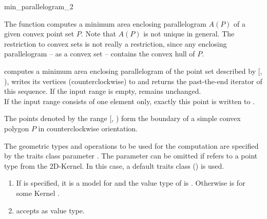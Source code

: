 \begin{ccRefFunction}{min_parallelogram_2}
  
  \ccDefinition The function computes a minimum area enclosing
  parallelogram $A(P)$ of a given convex point set $P$.  Note that
  $A(P)$ is not unique in general.  The restriction to convex sets is
  not really a restriction, since any enclosing parallelogram -- as a
  convex set -- contains the convex hull of $P$.


  \def\ccLongParamLayout{\ccTrue} 
  
  
  computes a minimum area enclosing parallelogram of the point set
  described by [, ), writes its
  vertices (counterclockwise) to  and returns the past-the-end
  iterator of this sequence.
  If the input range is empty,  remains unchanged.\\
  If the input range consists of one element only,
  exactly this point is written to .
  
  \ccPrecond The points denoted by the range [,
  ) form the boundary of a simple convex polygon $P$
  in counterclockwise orientation.

  The geometric types and operations to be used for the computation
  are specified by the traits class parameter . The parameter
  can be omitted if  refers to a point type from
  the 2D-Kernel. In this case, a default traits class
  () is used.
  
  \ccRequire
  \begin{enumerate}
  \item If  is specified, it is a model for
     and the value type  of
     is . Otherwise
     is  for some Kernel
    .
  \item {} accepts  as value type.
  \end{enumerate}
  

\end{ccRefFunction}
